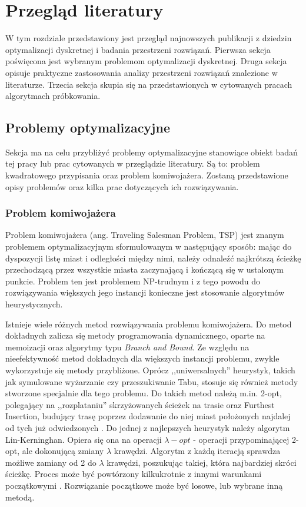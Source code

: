\chapter{Przegląd literatury}

W tym rozdziale przedstawiony jest przegląd najnowszych publikacji z dziedzin optymalizacji dyskretnej i badania przestrzeni rozwiązań.
Pierwsza sekcja poświęcona jest wybranym problemom optymalizacji dyskretnej.
Druga sekcja opisuje praktyczne zastosowania analizy przestrzeni rozwiązań znalezione w literaturze.
Trzecia sekcja skupia się na przedstawionych w cytowanych pracach algorytmach próbkowania.

\section{Problemy optymalizacyjne}
Sekcja ma na celu przybliżyć problemy optymalizacyjne stanowiące obiekt badań tej pracy lub prac cytowanych w przeglądzie literatury.
Są to: problem kwadratowego przypisania oraz problem komiwojażera. Zostaną przedstawione opisy problemów oraz kilka prac
dotyczących ich rozwiązywania.

\subsection{Problem komiwojażera}
Problem komiwojażera (ang. Traveling Salesman Problem, TSP) jest znanym problemem optymalizacyjnym
sformułowanym w następujący sposób: mając do dyspozycji listę miast i odległości między nimi, należy odnaleźć
najkrótszą ścieżkę przechodzącą przez wszystkie miasta zaczynającą i kończącą się w ustalonym punkcie.
Problem ten jest problemem NP-trudnym i z tego powodu do rozwiązywania większych jego instancji konieczne
jest stosowanie algorytmów heurystycznych.

Istnieje wiele różnych metod rozwiązywania problemu komiwojażera. Do metod dokładnych zalicza się metody programowania dynamicznego,
oparte na memoizacji oraz algorytmy typu \textit{Branch and Bound}.
Ze względu na nieefektywność metod dokładnych dla większych instancji problemu, zwykle wykorzystuje się metody przybliżone.
Oprócz ,,uniwersalnych'' heurystyk, takich jak symulowane wyżarzanie czy przeszukiwanie Tabu, stosuje się również metody stworzone
specjalnie dla tego problemu. Do takich metod należą m.in. 2-opt, polegający na ,,rozplataniu'' skrzyżowanych ścieżek na trasie oraz Furthest Insertion,
budujący trasę poprzez dodawanie do niej miast położonych najdalej od tych już odwiedzonych \cite{JUNGER1995225}.
Do jednej z najlepszych heurystyk należy algorytm Lin-Kerninghan.
Opiera się ona na operacji $\lambda-opt$ - operacji przypominającej 2-opt, ale dokonującą zmiany $\lambda$ krawędzi.
Algorytm z każdą iteracją sprawdza możliwe zamiany od 2 do $\lambda$ krawędzi, poszukując takiej, która najbardziej skróci ścieżkę.
Proces może być powtórzony kilkukrotnie z innymi warunkami początkowymi \cite{DBLP:journals/eor/Helsgaun00}. Rozwiązanie początkowe może być losowe, lub wybrane inną metodą.


